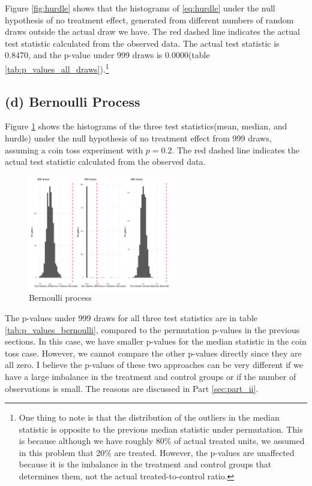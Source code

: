 \documentclass[11pt]{article}
\numberwithin{equation}{section}
\begin{document}
Figure \ref{fig:hurdle} shows that the histograms of \ref{eq:hurdle} under the null hypothesis of no treatment effect, generated from different numbers of random draws outside the actual draw we have. 
The red dashed line indicates the actual test statistic calculated from the observed data. 
The actual test statistic is 0.8470, and the p-value under 999 draws is 0.0000(table \ref{tab:p_values_all_draws}).\footnote{One thing to note is that the distribution of the outliers in the median statistic is opposite to the previous median statistic under permutation. This is because although we have roughly 80\% of actual treated units, we assumed in this problem that 20\% are treated. However, the p-values are unaffected because it is the imbalance in the treatment and control groups that determines them, not the actual treated-to-control ratio.}

\subsection*{(d) Bernoulli Process}


Figure \ref{fig:bernoulli} shows the histograms of the three test statistics(mean, median, and hurdle) under the null hypothesis of no treatment effect from 999 draws, assuming a coin toss experiment with $p=0.2$.
The red dashed line indicates the actual test statistic calculated from the observed data. 

\begin{figure}[h]
    \centering
    \includegraphics[width=\textwidth, height=5cm]{output/histograms_bernoulli.png}
    \caption{\label{fig:bernoulli}Bernoulli process}
\end{figure}


The p-values under 999 draws for all three test statistics are in table \ref{tab:p_values_bernoulli}, compared to the permutation p-values in the previous sections.
In this case, we have smaller p-values for the median statistic in the coin toss case. However, we cannot compare 
the other p-values directly since they are all zero. I believe the p-values of these two approaches can be very different if we have a large imbalance in the treatment and control groups or if the number of observations is small.
The reasons are discussed in Part \ref{sec:part_ii}.
\end{document}
